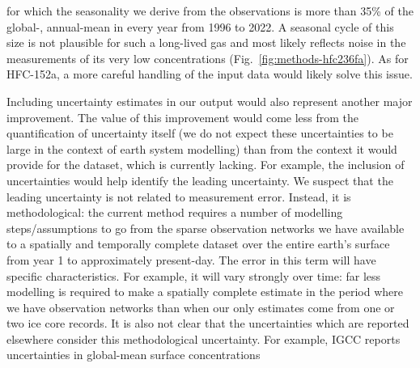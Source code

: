 for which the seasonality we derive from the observations is more than 35\% of the global-, annual-mean
in every year from 1996 to 2022.
A seasonal cycle of this size is not plausible for such a long-lived gas
and most likely reflects noise in the measurements of its very low concentrations (Fig.~\ref{fig:methods-hfc236fa}).
As for HFC-152a, a more careful handling of the input data would likely solve this issue.

Including uncertainty estimates in our output would also represent another major improvement.
The value of this improvement would come less from the quantification of uncertainty itself
(we do not expect these uncertainties to be large in the context of earth system modelling)
than from the context it would provide for the dataset, which is currently lacking.
For example, the inclusion of uncertainties would help identify the leading uncertainty.
We suspect that the leading uncertainty is not related to measurement error.
Instead, it is methodological: the current method requires a number of modelling steps/assumptions
to go from the sparse observation networks we have available to a spatially and temporally complete dataset
over the entire earth's surface from year 1 to approximately present-day.
The error in this term will have specific characteristics.
For example, it will vary strongly over time:
far less modelling is required to make a spatially complete estimate in the period where we have observation networks
than when our only estimates come from one or two ice core records.
It is also not clear that the uncertainties which are reported elsewhere consider this methodological uncertainty.
For example, IGCC \citep{forster_igcc_2026} reports uncertainties in global-mean surface concentrations
